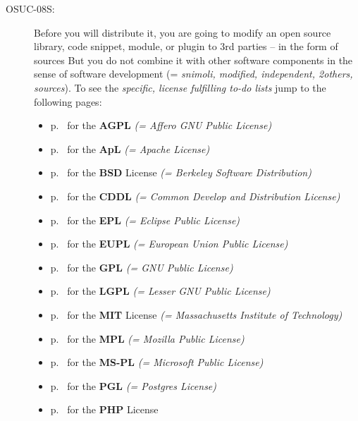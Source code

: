 \begin{description}
\item[OSUC-08S:]\label{OSUC-08S-DEF} Before you will distribute it, you are going
to modify an open source library, code snippet, module, or plugin to 3rd parties
 -- in the form of sources But you do not combine it with other software
components in the sense of software development (= \textit{snimoli, modified,
independent, 2others, sources}). To see the \textit{specific, license fulfilling
to-do lists} jump to the following pages:
  \begin{itemize}
    \item p.\ \pageref{OSUC-08S-AGPL} for the \textbf{AGPL}
      \textit{(= Affero GNU Public License)} 
    \item p.\ \pageref{OSUC-08S-Apache20} for the \textbf{ApL}
      \textit{(= Apache License)}
    \item p.\ \pageref{OSUC-08S-BSD} for the \textbf{BSD} License
      \textit{(= Berkeley Software Distribution)}
    \item p.\ \pageref{OSUC-08S-CDDL} for the \textbf{CDDL}
      \textit{(= Common Develop and Distribution License)}  
    \item p.\ \pageref{OSUC-08S-EPL} for the \textbf{EPL}
      \textit{(= Eclipse Public License)}     
    \item p.\ \pageref{OSUC-08S-EUPL} for the \textbf{EUPL}
      \textit{(= European Union Public License)} 
    \item p.\ \pageref{OSUC-08S-GPL} for the \textbf{GPL}
       \textit{(= GNU Public License)} 
    \item p.\ \pageref{OSUC-08S-LGPL} for the \textbf{LGPL}
      \textit{(= Lesser GNU Public License)}           
    \item p.\ \pageref{OSUC-08S-MIT} for the \textbf{MIT} License
       \textit{(= Massachusetts Institute of Technology)} 
    \item p.\ \pageref{OSUC-08S-MPL} for the \textbf{MPL}
      \textit{(= Mozilla Public License)}     
    \item p.\ \pageref{OSUC-08S-MS-PL} for the \textbf{MS-PL}
      \textit{(= Microsoft Public License)} 
    \item p.\ \pageref{OSUC-08S-PGL} for the \textbf{PGL}
      \textit{(= Postgres License)} 
    \item p.\ \pageref{OSUC-08S-PHP} for the \textbf{PHP} License 
  \end{itemize}


\end{description}
